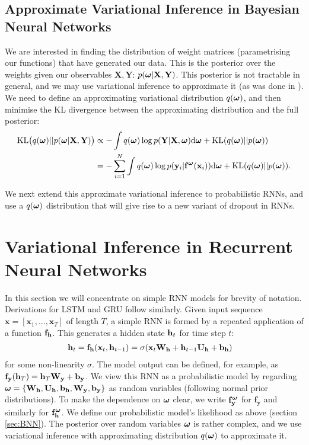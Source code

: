 \documentclass{article}
\newcommand{\td}{\text{d}}
\newcommand{\f}{\mathbf{f}}
\newcommand{\x}{\mathbf{x}}
\newcommand{\Bb}{\mathbf{b}}
\newcommand{\y}{\mathbf{y}}
\newcommand{\W}{\mathbf{W}}
\newcommand{\X}{\mathbf{X}}
\newcommand{\Y}{\mathbf{Y}}
\newcommand{\bo}{\text{\boldmath$\omega$}}
\newcommand{\KL}{\text{KL}}
\theoremstyle{definition}
\begin{document}
\subsection{Approximate Variational Inference in Bayesian Neural Networks}
We are interested in finding the distribution of weight matrices (parametrising our functions) that have generated our data. This is the posterior over the weights given our observables $\X, \Y$: $p( \bo | \X, \Y )$. 
This posterior is not tractable in general, and we may use variational inference to approximate it (as was done in \citep{hinton1993keeping,
barber1998ensemble,
graves2011practical,
blundell2015weight}). We need to define an approximating variational distribution $q( \bo )$, and then minimise the KL divergence between the approximating distribution and the full posterior:
\begin{align} \label{eq:KL:BNN}
\KL \big( q(\bo) || p(\bo | \X, \Y ) \big)
&\propto - \int q(\bo) \log p(\Y | \X, \bo) \td \bo + \KL(q(\bo) || p(\bo)) 
\notag \\
&=- \sum_{i=1}^N \int q(\bo) \log p(\y_i | \f^\bo(\x_i)) \td \bo + \KL(q(\bo) || p(\bo)).
\end{align}


We next extend this approximate variational inference to probabilistic RNNs, and use a $q(\bo)$ distribution that will give rise to a new variant of dropout in RNNs.


\section{Variational Inference in Recurrent Neural Networks}

In this section we will concentrate on simple RNN models for brevity of notation. Derivations for LSTM and GRU follow similarly.
Given input sequence $\x = [\x_1, ..., \x_T]$ of length $T$, a simple RNN is formed by a repeated application of a function $\f_{\h}$. This generates a hidden state $\mathbf{h}_t$ for time step $t$:
\begin{align*}
\h_t &= \f_{\h}(\x_t, \h_{t-1}) = \sigma(\x_t \W_\h + \h_{t-1} \U_\h + \Bb_\h)
\end{align*}
for some non-linearity $\sigma$.
The model output can be defined, for example, as $\f_\y(\h_T) = \h_T \W_\y + \Bb_\y$. We view this RNN as a probabilistic model by regarding $\bo = \{\W_\h, \U_\h, \Bb_\h, \W_\y, \Bb_\y\}$ as random variables (following normal prior distributions).
To make the dependence on $\bo$ clear, we write $\f^\bo_\y$ for $\f_\y$ and similarly for $\f^\bo_\h$.
We define our probabilistic model's likelihood as above (section \ref{sec:BNN}).
The posterior over random variables $\bo$ is rather complex, and we use variational inference with approximating distribution $q(\bo)$ to approximate it.
\end{document}
